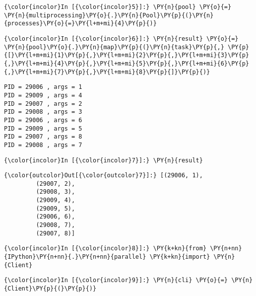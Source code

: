     \begin{Verbatim}[commandchars=\\\{\}]
{\color{incolor}In [{\color{incolor}5}]:} \PY{n}{pool} \PY{o}{=} \PY{n}{multiprocessing}\PY{o}{.}\PY{n}{Pool}\PY{p}{(}\PY{n}{processes}\PY{o}{=}\PY{l+m+mi}{4}\PY{p}{)}
\end{Verbatim}

    \begin{Verbatim}[commandchars=\\\{\}]
{\color{incolor}In [{\color{incolor}6}]:} \PY{n}{result} \PY{o}{=} \PY{n}{pool}\PY{o}{.}\PY{n}{map}\PY{p}{(}\PY{n}{task}\PY{p}{,} \PY{p}{[}\PY{l+m+mi}{1}\PY{p}{,}\PY{l+m+mi}{2}\PY{p}{,}\PY{l+m+mi}{3}\PY{p}{,}\PY{l+m+mi}{4}\PY{p}{,}\PY{l+m+mi}{5}\PY{p}{,}\PY{l+m+mi}{6}\PY{p}{,}\PY{l+m+mi}{7}\PY{p}{,}\PY{l+m+mi}{8}\PY{p}{]}\PY{p}{)}
\end{Verbatim}

    \begin{Verbatim}[commandchars=\\\{\}]
PID = 29006 , args = 1
PID = 29009 , args = 4
PID = 29007 , args = 2
PID = 29008 , args = 3
PID = 29006 , args = 6
PID = 29009 , args = 5
PID = 29007 , args = 8
PID = 29008 , args = 7

    \end{Verbatim}

    \begin{Verbatim}[commandchars=\\\{\}]
{\color{incolor}In [{\color{incolor}7}]:} \PY{n}{result}
\end{Verbatim}

            \begin{Verbatim}[commandchars=\\\{\}]
{\color{outcolor}Out[{\color{outcolor}7}]:} [(29006, 1),
         (29007, 2),
         (29008, 3),
         (29009, 4),
         (29009, 5),
         (29006, 6),
         (29008, 7),
         (29007, 8)]
\end{Verbatim}
        






    \begin{Verbatim}[commandchars=\\\{\}]
{\color{incolor}In [{\color{incolor}8}]:} \PY{k+kn}{from} \PY{n+nn}{IPython}\PY{n+nn}{.}\PY{n+nn}{parallel} \PY{k+kn}{import} \PY{n}{Client}
\end{Verbatim}

    \begin{Verbatim}[commandchars=\\\{\}]
{\color{incolor}In [{\color{incolor}9}]:} \PY{n}{cli} \PY{o}{=} \PY{n}{Client}\PY{p}{(}\PY{p}{)}
\end{Verbatim}



